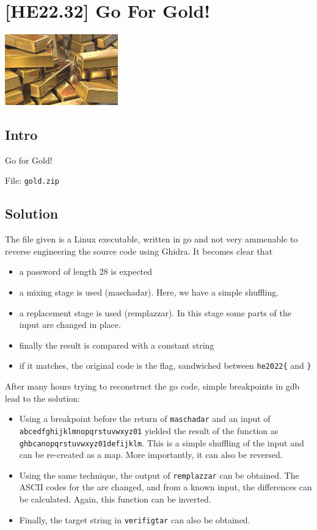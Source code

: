 
\hypertarget{he22.32}{%
\chapter{[HE22.32] Go For Gold!}\label{he22.32}}

\begin{marginfigure}
	\includegraphics[width=49mm]{level7/challenge32.jpg}
\end{marginfigure}
\section{Intro}
Go for Gold!

File: \verb+gold.zip+


\section{Solution}\label{hv22.32solution}

The file given is a Linux executable, written in go and not very ammenable to reverse engineering the source code using Ghidra.  It becomes clear that
\begin{itemize}
\item a password of length 28 is expected
\item a mixing stage is used (maschadar).  Here, we have a simple shuffling.
\item a replacement stage is used (remplazzar).  In this stage some parts of the input are changed in place.
\item finally the result is compared with a constant string
\item if it matches, the original code is the flag, sandwiched between \verb+he2022{+ and \verb+}+
\end{itemize}

After many hours trying to reconstruct the go code, simple breakpoints in gdb lead to the solution:
\begin{itemize}
\item Using a breakpoint before the return of \verb+maschadar+ and an input of \verb+abcedfghijklmnopqrstuvwxyz01+ yielded the result of the function as \verb+ghbcanopqrstuvwxyz01defijklm+.  This is a simple shuffling of the input and can be re-created as a map.  More importantly, it can also be reversed.
\item Using the same technique, the output of \verb+remplazzar+ can be obtained. The ASCII codes for the are changed, and from a known input, the differences can be calculated.  Again, this function can be inverted.
\item Finally, the target string in \verb+verifigtar+ can also be obtained.
\end{itemize}

